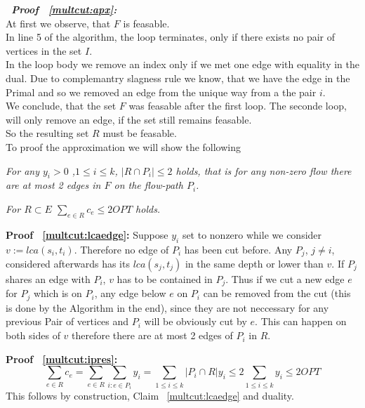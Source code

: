 \begin{description}
   \item{\bfseries\itshape~Proof ~\ref{multcut:apx}:}\\
      At first we observe, that $F$ is feasable.\\
      In line 5 of the algorithm, the loop terminates, only
      if there exists no pair of vertices in the set $I$.\\
      In the loop body we remove an index only if we met one
      edge with equality in the dual. Due to complemantry slagness rule
      we know, that we have the edge in the Primal and so we removed an
      edge from the unique way from a the pair $i$.\\
      We conclude, that the set $F$ was feasable after the first loop.
      The seconde loop, will only remove an edge, if the set still remains feasable.\\
      So the resulting set $R$ must be feasable.\\

      To proof the approximation we will show the following
      \begin{lemma}\label{multcut:lcaedge}\mdseries\itshape
         For any $y_i > 0$ ,$1\leq i \leq k$, $|R \cap P_i| \leq 2$ holds,
         that is for any non-zero flow there are at most 2 edges in $F$ on the flow-path $P_i$.
      \end{lemma}

      \begin{lemma}\label{multcut:ipres}\mdseries\itshape
         For $R \subset E$  $\sum_{e \in R} c_e \leq 2OPT$ holds.
      \end{lemma}

      \begin{description}
         \item{\bfseries Proof ~\ref{multcut:lcaedge}:}
            Suppose $y_i$ set to nonzero while we consider 
            $v := lca(s_i,t_i)$. Therefore no edge of $P_i$ has been cut before.
	Any $P_j$, $j \neq i$, considered afterwards has its $lca(s_j,t_j)$  
            in the same depth or lower than $v$. If $P_j$ shares an edge with $P_i$, $v$ has to be contained in $P_j$. 
            Thus if we cut a new edge $e$ for $P_j$ which is on $P_i$, any edge below $e$ on $P_i$ can be removed from the 		cut (this is done by the Algorithm in the end), since they are not neccessary for any previous Pair of vertices and $P_i$ will be obviously cut by $e$. This can 		happen on both sides of $v$ therefore there are at most 2 edges of $P_i$ in $R$.

         \item{\bfseries Proof ~\ref{multcut:ipres}:}
	         $$ \sum_{e \in R} c_e =\sum_{e \in R} \sum_{i : e \in P_i} 
            y_i = \sum_{1 \leq i \leq k} |P_i \cap R| y_i \leq 2 \sum_{1 \leq i \leq k} y_i \leq 2OPT$$
            This follows by construction, Claim ~\ref{multcut:lcaedge} and duality.
      \end{description}
\end{description}
